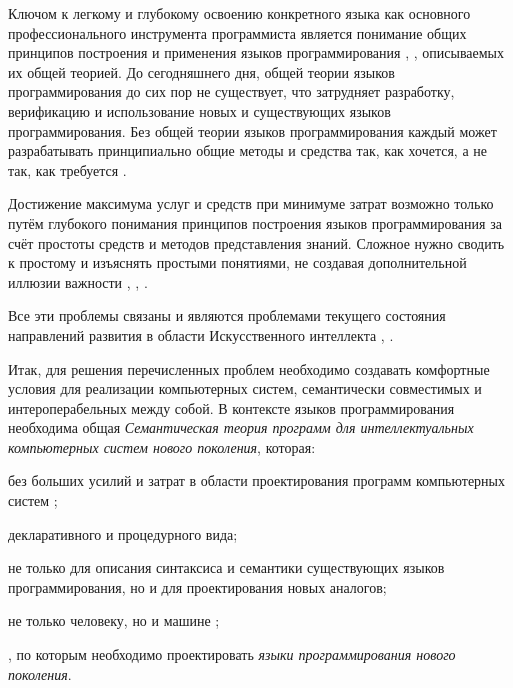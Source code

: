 \begin{textitemize}
    \item Ключом к легкому и глубокому освоению конкретного языка как основного профессионального инструмента программиста является понимание общих принципов построения и применения языков программирования \cite{Turner2007}, \cite{Constanta2022}, описываемых их общей теорией. До сегодняшнего дня, общей теории языков программирования до сих пор не существует, что затрудняет разработку, верификацию и использование новых и существующих языков программирования. Без общей теории языков программирования каждый может разрабатывать принципиально общие методы и средства так, как хочется, а не так, как требуется .
    \item Достижение максимума услуг и средств при минимуме затрат возможно только путём глубокого понимания принципов построения языков программирования за счёт простоты средств и методов представления знаний. Сложное нужно сводить к простому и изъяснять простыми понятиями, не создавая дополнительной иллюзии важности \cite{Sellitto2022}, \cite{Chaparro2014}, \cite{Posnett2011}.
\end{textitemize}

Все эти проблемы связаны и являются проблемами текущего состояния направлений развития в области Искусственного интеллекта \cite{Skeeter2020}, \cite{Constanta2022}.

Итак, для решения перечисленных проблем необходимо создавать комфортные условия для реализации компьютерных систем, семантически совместимых и интероперабельных между собой. В контексте языков программирования необходима общая \textit{Семантическая теория программ для интеллектуальных компьютерных систем нового поколения}, которая:
\begin{textitemize}
    \item {} без больших усилий и затрат  в области проектирования программ компьютерных систем ;
    \item {} декларативного и процедурного вида;
    \item {} не только для описания синтаксиса и семантики существующих языков программирования, но и для проектирования новых аналогов;
    \item {} не только человеку, но и машине ;
    \item {}, по которым необходимо проектировать \textit{языки программирования нового поколения}.
\end{textitemize}


